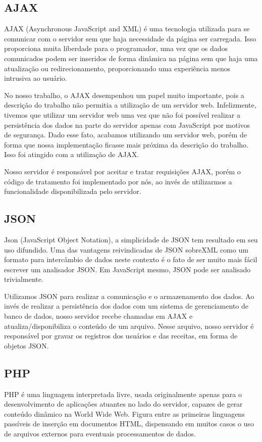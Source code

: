 \documentclass{article}
\begin{document}
\subsection{AJAX}
AJAX (Asynchronous JavaScript and XML) é uma tecnologia utilizada para se comunicar com o servidor sem que haja necessidade da
página ser carregada. Isso proporciona muita liberdade para o programador, uma vez que os dados comunicados podem ser inseridos de forma
dinâmica na página sem que haja uma atualização ou redirecionamento, proporcionando uma experiência menos intrusiva ao usuário.

No nosso trabalho, o AJAX desempenhou um papel muito importante, pois a descrição do trabalho não permitia a utilização de um servidor web.
Infelizmente, tivemos que utilizar um servidor web uma vez que não foi possível realizar a persistência dos dados na parte do servidor apenas
com JavaScript por motivos de segurança. Dado esse fato, acabamos utilizando um servidor web, porém de forma que nossa implementação ficasse mais
próxima da descrição do trabalho. Isso foi atingido com a utilização de AJAX. 

Nosso servidor é responsável por aceitar e tratar requisições AJAX, porém o código de tratamento foi implementado por nós, ao invés de utilizarmos a funcionalidade disponibilizada pelo servidor.

\subsection{JSON}
Json  (JavaScript Object Notation), a simplicidade de JSON tem resultado em seu uso difundido.  Uma das vantagens reivindicadas de JSON sobreXML como um formato para intercâmbio de dados neste contexto é o fato de ser muito mais fácil escrever um analisador JSON. Em JavaScript mesmo, JSON pode ser analisado trivialmente.

Utilizamos JSON para realizar a comunicação e o armazenamento dos dados. Ao invés de realizar a persistência dos dados com um sistema de gerenciamento de banco de dados, nosso servidor recebe chamadas em AJAX e atualiza/disponibiliza o conteúdo de um arquivo. Nesse arquivo, nosso servidor é responsável por gravar os registros dos usuários e das receitas, em forma de objetos JSON.

\subsection{PHP}
PHP é uma linguagem interpretada livre, usada originalmente apenas para o desenvolvimento de aplicações atuantes no lado do servidor, capazes de gerar conteúdo dinâmico na World Wide Web. Figura entre as primeiras linguagens passíveis de inserção em documentos HTML, dispensando em muitos casos o uso de arquivos externos para eventuais processamentos de dados.
\end{document}
